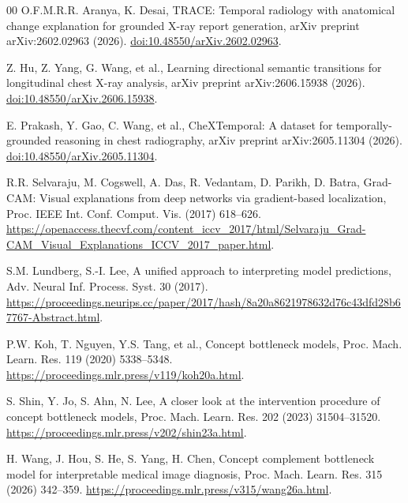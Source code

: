 \documentclass[preprint,12pt]{elsarticle}
\begin{document}
\begin{thebibliography}{00}
O.F.M.R.R. Aranya, K. Desai,
TRACE: Temporal radiology with anatomical change explanation for grounded
X-ray report generation,
arXiv preprint arXiv:2602.02963 (2026).
\href{https://doi.org/10.48550/arXiv.2602.02963}{doi:10.48550/arXiv.2602.02963}.

Z. Hu, Z. Yang, G. Wang, et al.,
Learning directional semantic transitions for longitudinal chest X-ray
analysis,
arXiv preprint arXiv:2606.15938 (2026).
\href{https://doi.org/10.48550/arXiv.2606.15938}{doi:10.48550/arXiv.2606.15938}.

E. Prakash, Y. Gao, C. Wang, et al.,
CheXTemporal: A dataset for temporally-grounded reasoning in chest radiography,
arXiv preprint arXiv:2605.11304 (2026).
\href{https://doi.org/10.48550/arXiv.2605.11304}{doi:10.48550/arXiv.2605.11304}.

R.R. Selvaraju, M. Cogswell, A. Das, R. Vedantam, D. Parikh, D. Batra,
Grad-CAM: Visual explanations from deep networks via gradient-based
localization,
Proc. IEEE Int. Conf. Comput. Vis. (2017) 618--626.
\url{https://openaccess.thecvf.com/content_iccv_2017/html/Selvaraju_Grad-CAM_Visual_Explanations_ICCV_2017_paper.html}.

S.M. Lundberg, S.-I. Lee,
A unified approach to interpreting model predictions,
Adv. Neural Inf. Process. Syst. 30 (2017).
\url{https://proceedings.neurips.cc/paper/2017/hash/8a20a8621978632d76c43dfd28b67767-Abstract.html}.

P.W. Koh, T. Nguyen, Y.S. Tang, et al.,
Concept bottleneck models,
Proc. Mach. Learn. Res. 119 (2020) 5338--5348.
\url{https://proceedings.mlr.press/v119/koh20a.html}.

S. Shin, Y. Jo, S. Ahn, N. Lee,
A closer look at the intervention procedure of concept bottleneck models,
Proc. Mach. Learn. Res. 202 (2023) 31504--31520.
\url{https://proceedings.mlr.press/v202/shin23a.html}.

H. Wang, J. Hou, S. He, S. Yang, H. Chen,
Concept complement bottleneck model for interpretable medical image diagnosis,
Proc. Mach. Learn. Res. 315 (2026) 342--359.
\url{https://proceedings.mlr.press/v315/wang26a.html}.

\end{thebibliography}
\end{document}
